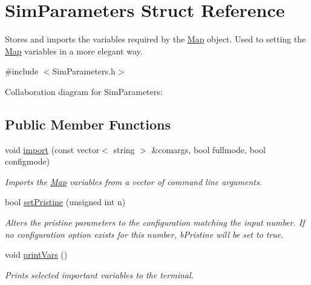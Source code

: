 \hypertarget{struct_sim_parameters}{}\section{Sim\+Parameters Struct Reference}
\label{struct_sim_parameters}


Stores and imports the variables required by the \hyperlink{class_map}{Map} object. Used to setting the \hyperlink{class_map}{Map} variables in a more elegant way.  




{\ttfamily \#include $<$Sim\+Parameters.\+h$>$}



Collaboration diagram for Sim\+Parameters\+:
\subsection*{Public Member Functions}
\begin{DoxyCompactItemize}
\item 
void \hyperlink{struct_sim_parameters_a4b94309cb0f4834bdcf7aa8a67d252e2}{import} (const vector$<$ string $>$ \&comargs, bool fullmode, bool configmode)
\begin{DoxyCompactList}\small\item\em Imports the \hyperlink{class_map}{Map} variables from a vector of command line arguments. \end{DoxyCompactList}\item 
bool \hyperlink{struct_sim_parameters_a35fef102ce86c4158d2ae0e19ad0a85e}{set\+Pristine} (unsigned int n)
\begin{DoxyCompactList}\small\item\em Alters the pristine parameters to the configuration matching the input number. If no configuration option exists for this number, b\+Pristine will be set to true. \end{DoxyCompactList}\item 
void \hyperlink{struct_sim_parameters_ac7072f58a9dccc718341d25a84148ffc}{print\+Vars} ()\hypertarget{struct_sim_parameters_ac7072f58a9dccc718341d25a84148ffc}{}\label{struct_sim_parameters_ac7072f58a9dccc718341d25a84148ffc}

\begin{DoxyCompactList}\small\item\em Prints selected important variables to the terminal. \end{DoxyCompactList}\end{DoxyCompactItemize}
